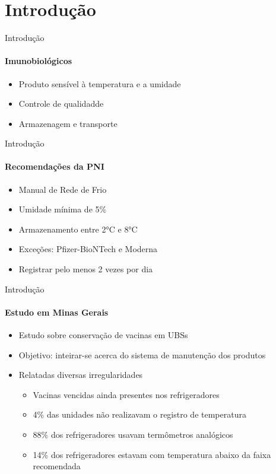 \section{Introdução}
\begin{frame}{Introdução}
  \framesubtitle{Imunobiológicos}
  
  \begin{itemize}
    \item Produto sensível à temperatura e a umidade
    \item Controle de qualidadde
    \item Armazenagem e transporte
  \end{itemize}
\end{frame}

\begin{frame}{Introdução}
  \framesubtitle{Recomendações da PNI}
  
  \begin{itemize}
    \item Manual de Rede de Frio
    \item Umidade mínima de \alert{5\%}
    \item Armazenamento entre \alert{2°C} e \alert{8°C}
    \item Exceções: Pfizer-BioNTech e Moderna
    \item Registrar pelo menos \alert{2} vezes por dia
  \end{itemize}
\end{frame}

\begin{frame}{Introdução}
  \framesubtitle{Estudo em Minas Gerais}
  
  \begin{itemize}
    \item Estudo sobre conservação de vacinas em UBSs
    \item Objetivo: inteirar-se acerca do sistema de manutenção dos produtos
    \item Relatadas diversas irregularidades
    \begin{itemize}
      \item Vacinas vencidas ainda presentes nos refrigeradores
      \item \alert{4\%} das unidades não realizavam o registro de temperatura
      \item \alert{88\%} dos refrigeradores usavam termômetros analógicos
      \item \alert{14\%} dos refrigeradores estavam com temperatura abaixo da faixa recomendada
    \end{itemize}
  \end{itemize}
\end{frame}

